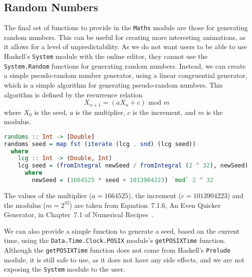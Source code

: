 \documentclass[../main.tex]{subfiles}
\begin{document}
        \subsection{Random Numbers}
            The final set of functions to provide in the \texttt{Maths} module are those
                for generating random numbers.
            This can be useful for creating more interesting animations, as it allows for a
                level of unpredictability.
            As we do not want users to be able to use Haskell's \texttt{System} module with
                the online editor, they cannot use the \texttt{System.Random} functions for
                generating random numbers.
            Instead, we can create a simple pseudo-random number generator, using a linear
                congruential generator, which is a simple algorithm for generating
                pseudo-random numbers.
            This algorithm is defined by the recurrence relation $$X_{n+1} = (aX_n + c)
                    \text{ mod } m$$ where $X_0$ is the seed, $a$ is the multiplier, $c$ is the
                increment, and $m$ is the modulus.

            \begin{lstlisting}[language={Haskell}, label={lst:random}, caption={The random number generator, 
                (\texttt{randoms}) which uses a linear congruential generator to generate an 
                infinite list of pseudo-random numbers, mapped to the range [0, 1].}]
randoms :: Int -> [Double]
randoms seed = map fst (iterate (lcg . snd) (lcg seed))
  where
    lcg :: Int -> (Double, Int)
    lcg seed = (fromIntegral newSeed / fromIntegral (2 ^ 32), newSeed)
      where
        newSeed = (1664525 * seed + 1013904223) `mod` 2 ^ 32\end{lstlisting}

            The values of the multiplier ($a=1664525$), the increment ($c=1013904223$) and
                the modulus ($m=2^{32}$) are taken from Equation~7.1.6, An Even Quicker
                Generator, in Chapter~7.1 of Numerical Recipes~\citep{numericalRecipes}.

            We can also provide a simple function to generate a seed, based on the current
                time, using the \texttt{Data.Time.Clock.POSIX} module's \texttt{getPOSIXTime}
                function.
            Although the \texttt{getPOSIXTime} function does not come from Haskell's
                \texttt{Prelude} module, it is still safe to use, as it does not have any side
                effects, and we are not exposing the \texttt{System} module to the user.
\end{document}
